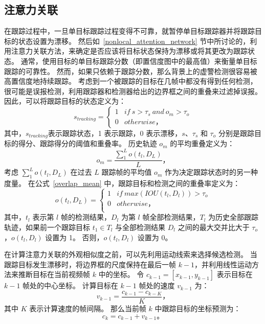 \subsection{注意力关联}
\label{attention_association}
在跟踪过程中，一旦单目标跟踪过程变得不可靠，就暂停单目标跟踪器并将跟踪目标的状态设置为漂移。 
然后如~\ref{nonlocal_attention_network} 节中所讨论的，利用注意力关联方法，来确定是否应该将目标状态保持为漂移或将其更改为跟踪状态。 
通常，使用目标的单目标跟踪分数（即置信度图中的最高值）来衡量单目标跟踪的可靠性。 
然而，如果只依赖于跟踪分数，那么背景上的虚警检测很容易被高置信度地持续跟踪。 
考虑到一个被跟踪的目标在几帧中都没有得到任何检测，很可能是误报检测，利用跟踪器和检测器给出的边界框之间的重叠来过滤掉误报。 
因此，可以将跟踪目标的状态定义为：
\begin{equation}
s_{tracking}=\left\{
\begin{array}{rcl}
1 & {if \ s > \tau_s \ and \ o_{m} > \tau_o}\\
0 & {otherwise}\mbox{，} 
\end{array} \right.
\end{equation}
其中，$ s_{tracking} $表示跟踪状态，1 表示跟踪，0 表示漂移，$s$、$\tau_s$ 和 $\tau_o$ 分别是跟踪目标的得分、跟踪得分的阈值和重叠率。 
历史轨迹 $o_{m}$ 的平均重叠定义为：
\begin{equation}
\label{overlap_mean}
o_{m}=\frac{\sum_{1}^{L} o\left(t_l,D_L\right)}{L}\mbox{，}
\end{equation}
考虑 $\sum_{1}^{L} o\left(t_l,D_L\right) $ 在过去 $ L $ 跟踪帧的平均值 $ o_{m} $ 作为决定跟踪状态时的另一种度量。
在公式~\ref{overlap_mean} 中，跟踪目标和检测之间的重叠率定义为：
\begin{equation}
\label{overlap_target_detection}
o \left(t_l,D_L\right) =\left\{
\begin{array}{rcl}
1& {if \ max \left(IOU \left(t_l,D_l\right) \right) > \tau_o } \\
0& {otherwise}\mbox{，} \\
\end{array} \right.
\end{equation}
其中，$t_l$ 表示第 $ l $ 帧的检测结果，$ D_l $ 为第 $ l $ 帧全部检测结果，$ T_l $ 为历史全部跟踪轨迹，如果前一个跟踪目标 $ t_1 \in T_l $ 与全部检测结果 $ D_l $ 之间的最大交并比大于 $\tau_o$，$o \left(t_l,D_l\right) $ 设置为 1。
否则，$o \left(t_l,D_l\right) $ 设置为 0。

在计算注意力关联的外观相似度之前，可以先利用运动线索来选择候选检测。 
当跟踪目标发生漂移时，将边界框的尺度保持在最后一帧 $k-1$，并利用线性运动方法来推断目标在当前视频帧 $k$ 中的坐标。 
令 $ c_{k-1}=\left[x_{k-1},y_{k-1}\right] $ 表示目标在 $ k-1 $ 帧处的中心坐标。 
计算目标在 $ k-1 $ 帧处的速度 $ v_{k-1} $ 为：
\begin{equation}
v_{k-1}=\frac{c_{k-1}-c_{k-K}}{K}\mbox{，}
\end{equation}
其中 $ K $ 表示计算速度的帧间隔。 
那么当前帧 $k$ 中跟踪目标的坐标预测为：
\begin{equation}
c_k=c_{k-1}+v_{k-1}\mbox{。}
\end{equation}

